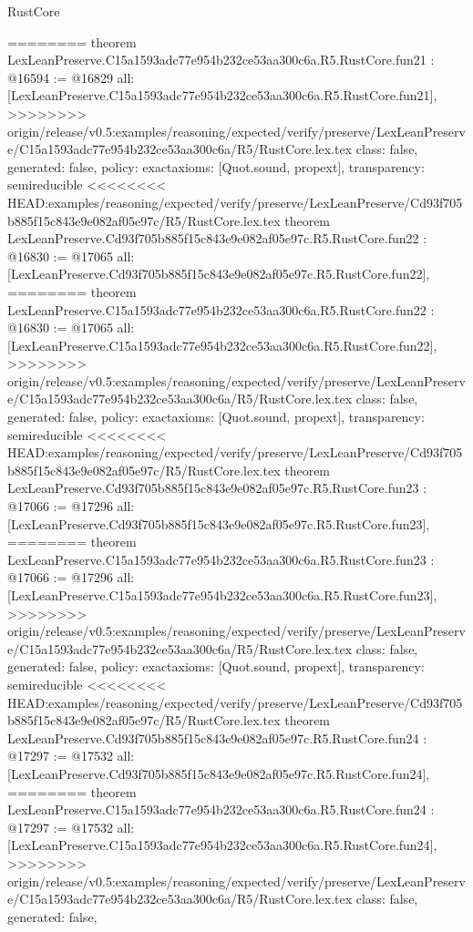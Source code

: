 \begin{lexlean}{RustCore}
\begin{coremodule}
{\begin{coremodule}
{{{{{{{{{{{{{{{{{{{{{{{{========
theorem LexLeanPreserve.C15a1593adc77e954b232ce53aa300c6a.R5.RustCore.fun21 : @16594 := @16829 {
  all: [LexLeanPreserve.C15a1593adc77e954b232ce53aa300c6a.R5.RustCore.fun21],
>>>>>>>> origin/release/v0.5:examples/reasoning/expected/verify/preserve/LexLeanPreserve/C15a1593adc77e954b232ce53aa300c6a/R5/RustCore.lex.tex
  class: false,
  generated: false,
  policy: exact{axioms: [Quot.sound, propext]},
  transparency: semireducible
}
<<<<<<<< HEAD:examples/reasoning/expected/verify/preserve/LexLeanPreserve/Cd93f705b885f15c843e9e082af05e97c/R5/RustCore.lex.tex
theorem LexLeanPreserve.Cd93f705b885f15c843e9e082af05e97c.R5.RustCore.fun22 : @16830 := @17065 {
  all: [LexLeanPreserve.Cd93f705b885f15c843e9e082af05e97c.R5.RustCore.fun22],
========
theorem LexLeanPreserve.C15a1593adc77e954b232ce53aa300c6a.R5.RustCore.fun22 : @16830 := @17065 {
  all: [LexLeanPreserve.C15a1593adc77e954b232ce53aa300c6a.R5.RustCore.fun22],
>>>>>>>> origin/release/v0.5:examples/reasoning/expected/verify/preserve/LexLeanPreserve/C15a1593adc77e954b232ce53aa300c6a/R5/RustCore.lex.tex
  class: false,
  generated: false,
  policy: exact{axioms: [Quot.sound, propext]},
  transparency: semireducible
}
<<<<<<<< HEAD:examples/reasoning/expected/verify/preserve/LexLeanPreserve/Cd93f705b885f15c843e9e082af05e97c/R5/RustCore.lex.tex
theorem LexLeanPreserve.Cd93f705b885f15c843e9e082af05e97c.R5.RustCore.fun23 : @17066 := @17296 {
  all: [LexLeanPreserve.Cd93f705b885f15c843e9e082af05e97c.R5.RustCore.fun23],
========
theorem LexLeanPreserve.C15a1593adc77e954b232ce53aa300c6a.R5.RustCore.fun23 : @17066 := @17296 {
  all: [LexLeanPreserve.C15a1593adc77e954b232ce53aa300c6a.R5.RustCore.fun23],
>>>>>>>> origin/release/v0.5:examples/reasoning/expected/verify/preserve/LexLeanPreserve/C15a1593adc77e954b232ce53aa300c6a/R5/RustCore.lex.tex
  class: false,
  generated: false,
  policy: exact{axioms: [Quot.sound, propext]},
  transparency: semireducible
}
<<<<<<<< HEAD:examples/reasoning/expected/verify/preserve/LexLeanPreserve/Cd93f705b885f15c843e9e082af05e97c/R5/RustCore.lex.tex
theorem LexLeanPreserve.Cd93f705b885f15c843e9e082af05e97c.R5.RustCore.fun24 : @17297 := @17532 {
  all: [LexLeanPreserve.Cd93f705b885f15c843e9e082af05e97c.R5.RustCore.fun24],
========
theorem LexLeanPreserve.C15a1593adc77e954b232ce53aa300c6a.R5.RustCore.fun24 : @17297 := @17532 {
  all: [LexLeanPreserve.C15a1593adc77e954b232ce53aa300c6a.R5.RustCore.fun24],
>>>>>>>> origin/release/v0.5:examples/reasoning/expected/verify/preserve/LexLeanPreserve/C15a1593adc77e954b232ce53aa300c6a/R5/RustCore.lex.tex
  class: false,
  generated: false,
}}}}}}}}}}}}}}}}}}}}}}}}}}}}
\end{coremodule}}
\end{coremodule}
\end{lexlean}

